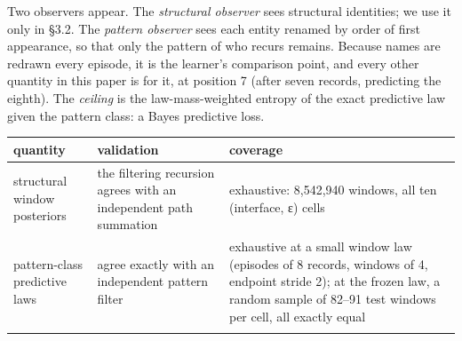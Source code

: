 \documentclass[10pt]{article}
\begin{document}
Two observers appear. The \emph{structural observer} sees structural identities; we use it only in §3.2. The \emph{pattern
observer} sees each entity renamed by order of first appearance, so that only the pattern of who recurs remains.
Because names are redrawn every episode, it is the learner's comparison point, and every other quantity in this paper
is for it, at position 7 (after seven records, predicting the eighth). The \emph{ceiling} is the law-mass-weighted entropy
of the exact predictive law given the pattern class: a Bayes predictive loss.

\begin{longtable}[]{@{}lll@{}}
\toprule
\begin{minipage}[b]{0.30\columnwidth}\raggedright
quantity\strut
\end{minipage} & \begin{minipage}[b]{0.30\columnwidth}\raggedright
validation\strut
\end{minipage} & \begin{minipage}[b]{0.30\columnwidth}\raggedright
coverage\strut
\end{minipage}\tabularnewline
\midrule
\endhead
\begin{minipage}[t]{0.30\columnwidth}\raggedright
structural window posteriors\strut
\end{minipage} & \begin{minipage}[t]{0.30\columnwidth}\raggedright
the filtering recursion agrees with an independent path summation\strut
\end{minipage} & \begin{minipage}[t]{0.30\columnwidth}\raggedright
exhaustive: 8,542,940 windows, all ten (interface, ε) cells\strut
\end{minipage}\tabularnewline
\begin{minipage}[t]{0.30\columnwidth}\raggedright
pattern-class predictive laws\strut
\end{minipage} & \begin{minipage}[t]{0.30\columnwidth}\raggedright
agree exactly with an independent pattern filter\strut
\end{minipage} & \begin{minipage}[t]{0.30\columnwidth}\raggedright
exhaustive at a small window law (episodes of 8 records, windows of 4, endpoint stride 2); at the frozen law, a random sample of 82--91 test windows per cell, all exactly equal\strut
\end{minipage}\tabularnewline
\begin{minipage}[t]{0.30\columnwidth}\raggedright

\end{minipage}
\end{longtable}
\end{document}
